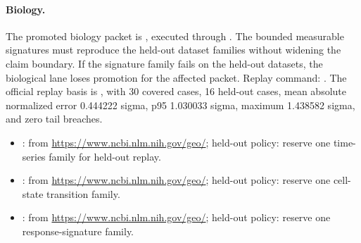 \paragraph{Biology.}
The promoted biology packet is
, executed
through
.
The bounded measurable signatures must reproduce the held-out dataset families
without widening the claim boundary. If the signature family fails on the
held-out datasets, the biological lane loses promotion for the affected packet.
Replay command:
.
The official replay basis is , with 30
covered cases, 16 held-out cases, mean absolute normalized error 0.444222
sigma, p95 1.030033 sigma, maximum 1.438582 sigma, and zero tail breaches.
\begin{itemize}[leftmargin=1.5em,nosep]
\item {}:  from \url{https://www.ncbi.nlm.nih.gov/geo/}; held-out policy: reserve one time-series family for held-out replay.
\item {}:  from \url{https://www.ncbi.nlm.nih.gov/geo/}; held-out policy: reserve one cell-state transition family.
\item {}:  from \url{https://www.ncbi.nlm.nih.gov/geo/}; held-out policy: reserve one response-signature family.
\end{itemize}

